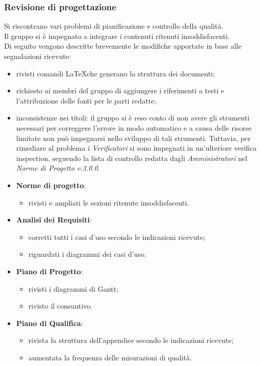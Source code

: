 	\subsubsection{Revisione di progettazione}
	
		Si riscontrano vari problemi di pianificazione e controllo della qualità. \\
		Il gruppo si è impegnato a integrare i contenuti ritenuti insoddisfacenti.\\ 
		 Di seguito vengono descritte brevemente le modifiche apportate in base alle segnalazioni ricevute:
	\begin{itemize}
		\item rivisti comandi \LaTeX \space che generano la struttura dei documenti;
		\item richiesto ai membri del gruppo di aggiungere i riferimenti a testi e l'attribuzione delle fonti per le parti redatte;
		\item inconsistenze nei titoli: il gruppo si è reso conto di non avere gli strumenti necessari per correggere l'errore in modo automatico e a causa delle risorse limitate non può impegnarsi nello sviluppo di tali strumenti. Tuttavia, per rimediare al problema i \textit{Verificatori} si sono impegnati in un'ulteriore verifica inspection\glosp, seguendo la lista di controllo redatta dagli \textit{Amministratori} nel \textit{Norme di Progetto v.3.0.0}. 
		\item \textbf{Norme di progetto}: 
			\begin{itemize}	
				\item rivisti e ampliati le sezioni ritenute insoddisfacenti.
			\end{itemize}
		\item \textbf{Analisi dei Requisiti}: 
			\begin{itemize}
				\item corretti tutti i casi d'uso secondo le indicazioni ricevute;
				\item riguardati i diagrammi dei casi d'uso.
			\end{itemize} 
		\item \textbf{Piano di Progetto}: 
			\begin{itemize}
				\item rivisti i diagrammi di Gantt;
				\item rivisto il consuntivo.
			\end{itemize}
		\item \textbf{Piano di Qualifica}: 
			\begin{itemize}
				\item rivista la struttura dell'appendice secondo le indicazioni ricevute;
				\item aumentata la frequenza delle misurazioni di qualità.
			\end{itemize}
	\end{itemize}
	
